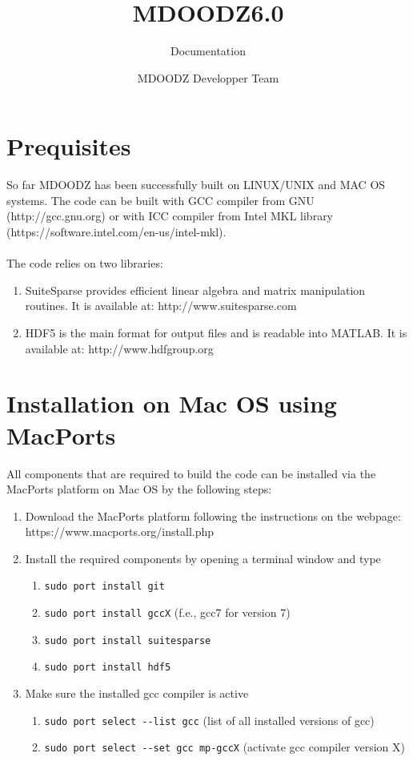 \documentclass[12pt,english,openany]{scrbook}
\title{MDOODZ6.0}
\author{MDOODZ Developper Team}
\subtitle{Documentation}
\begin{document}
\maketitle
\tableofcontents

\section{Prequisites}

So far MDOODZ has been successfully built on LINUX/UNIX and MAC OS systems. 
The code can be built with GCC compiler from GNU (http://gcc.gnu.org) or with ICC compiler from Intel MKL library (https://software.intel.com/en-us/intel-mkl).
 \\ \\
The code relies on two libraries: 
\begin{enumerate}
\item SuiteSparse provides efficient linear algebra and matrix manipulation routines. It is available at: http://www.suitesparse.com \\
\item HDF5 is the main format for output files and is readable into MATLAB. It is available at: http://www.hdfgroup.org
\end{enumerate}

\section{Installation on Mac OS using MacPorts}

All components that are required to build the code can be installed via the MacPorts platform on Mac OS by the following steps:

\begin{enumerate}
\item Download the MacPorts platform following the instructions on the webpage: https://www.macports.org/install.php
\item Install the required components by opening a terminal window and type
\begin{enumerate}
\item \verb|sudo port install git|
\item \verb|sudo port install gccX|		(f.e., gcc7 for version 7)
\item \verb|sudo port install suitesparse|
\item \verb|sudo port install hdf5|
\end{enumerate}
\item Make sure the installed gcc compiler is active
\begin{enumerate}
\item \verb|sudo port select --list gcc|  		(list of all installed versions of gcc)
\item \verb|sudo port select --set gcc mp-gccX|	(activate gcc compiler version X)	
\end{enumerate}
\end{enumerate}
\end{document}
